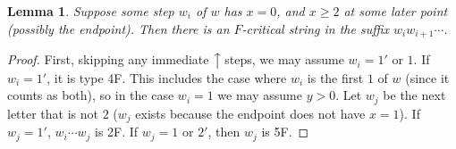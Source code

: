 \documentclass[10pt]{amsart}
\newtheorem{lemma}[theorem]{Lemma}
\theoremstyle{definition}
\newcommand{\north}[1]{\ensuremath{\big \uparrow \!\text{\raisebox{.1ex}{\scriptsize $#1$}}}}
\begin{document}
\begin{lemma} \label{lem:xgeq2-Fcritical}
Suppose some step $w_i$ of $w$ has $x=0$, and $x \geq 2$ at some later point \textup{(}possibly the endpoint\textup{)}. Then there is an $F$-critical string in the suffix $w_i w_{i+1} \cdots$.
\end{lemma}

\begin{proof}%
First, skipping any immediate $\north{}$ steps, we may assume $w_i = 1'$ or $1$. If $w_i = 1'$, it is type 4F. This includes the case where $w_i$ is the first $1$ of $w$ (since it counts as both), so in the case $w_i = 1$ we may assume $y>0$. Let $w_j$ be the next letter that is not $2$ ($w_j$ exists because the endpoint does not have $x=1$). If $w_j = 1'$, $w_i \cdots w_j$ is 2F. If $w_j = 1$ or $2'$, then $w_j$ is 5F.
\end{proof}
\end{document}

